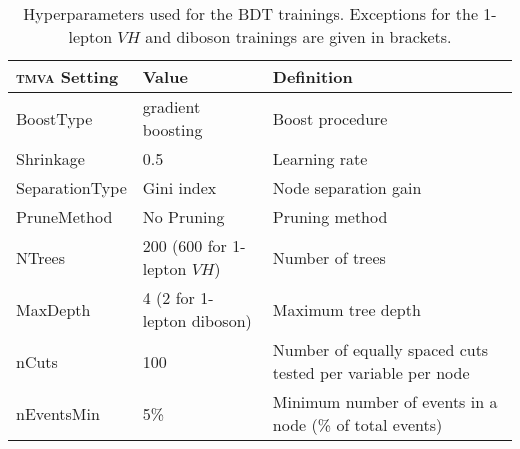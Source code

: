 \begin{table}[htbp]
  \begin{center}
    \begin{tabular}{llp{}}
      \toprule
      \textsc{tmva} Setting & Value & Definition \\
      \midrule
      BoostType & gradient boosting & Boost procedure \\
      Shrinkage & 0.5 & Learning rate \\
      SeparationType & Gini index & Node separation gain \\
      PruneMethod & No Pruning & Pruning method \\
      NTrees & 200 (600 for 1-lepton $VH$) & Number of trees \\
      MaxDepth & 4 (2 for 1-lepton diboson) & Maximum tree depth \\
      nCuts & 100 & Number of equally spaced cuts tested per variable per node \\
      nEventsMin & 5\% & Minimum number of events in a node (\% of total events) \\
      \bottomrule
    \end{tabular}
    \caption{Hyperparameters used for the BDT trainings. Exceptions for the
      1-lepton $VH$ and diboson trainings are given in brackets.}
    \label{tab:BDTSetup}
  \end{center}
\end{table}